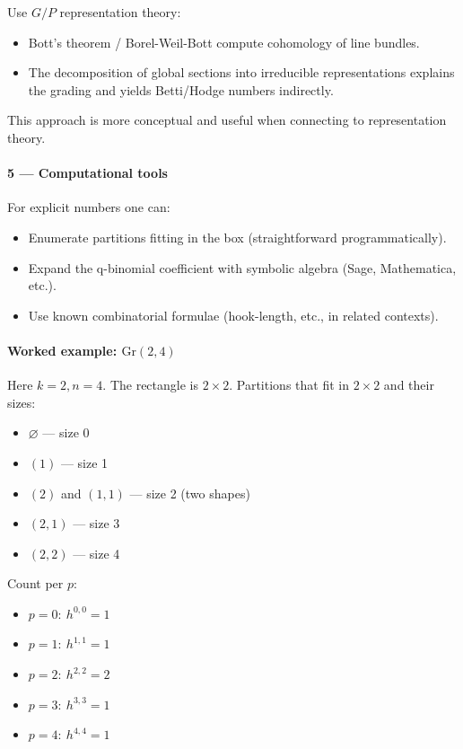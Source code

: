 \documentclass{amsart}
\theoremstyle{plain}
\theoremstyle{definition}
\theoremstyle{remark}
\begin{document}
Use $G/P$ representation theory:

\begin{itemize}
	\item Bott’s theorem / Borel-Weil-Bott compute cohomology of line bundles.
	\item The decomposition of global sections into irreducible representations explains the grading and yields Betti/Hodge numbers indirectly.
\end{itemize}

This approach is more conceptual and useful when connecting to representation theory.

\paragraph{5 — Computational tools}

For explicit numbers one can:

\begin{itemize}
	\item Enumerate partitions fitting in the box (straightforward programmatically).
	\item Expand the q-binomial coefficient with symbolic algebra (Sage, Mathematica, etc.).
	\item Use known combinatorial formulae (hook-length, etc., in related contexts).
\end{itemize}

\paragraph{Worked example: \texorpdfstring{$\mathrm{Gr}(2,4)$}{Gr(2,4)}}

Here $k=2,n=4$. The rectangle is $2\times 2$. Partitions that fit in $2\times2$ and their sizes:

\begin{itemize}
	\item $\varnothing$ — size 0
	\item $(1)$ — size 1
	\item $(2)$ and $(1,1)$ — size 2 (two shapes)
	\item $(2,1)$ — size 3
	\item $(2,2)$ — size 4
\end{itemize}

Count per $p$:

\begin{itemize}
	\item $p=0:\ h^{0,0}=1$
	\item $p=1:\ h^{1,1}=1$
	\item $p=2:\ h^{2,2}=2$
	\item $p=3:\ h^{3,3}=1$
	\item $p=4:\ h^{4,4}=1$
\end{itemize}
\end{document}
